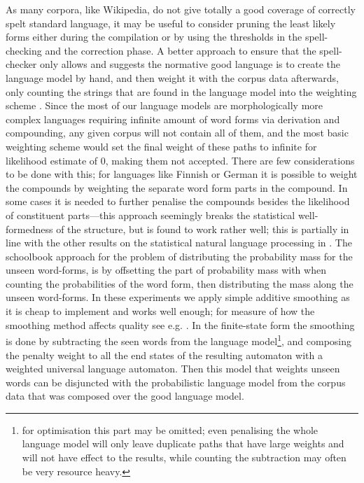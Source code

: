 \documentclass[a4paper,12pt]{article}
\begin{document}
As many corpora, like Wikipedia, do not give totally a good coverage of correctly
spelt standard language, it may be useful to consider pruning the least likely
forms either during the compilation or by using the thresholds in the spell-checking
and the correction phase. A better approach to ensure that the spell-checker only
allows and suggests the normative good language is to create the language model by
hand, and then weight it with the corpus data afterwards, only counting the strings
that are found in the language model into the weighting scheme
\cite[]{pirinen/2009/nodalida}. Since the most of our language models are
morphologically more complex languages requiring infinite amount of word forms
via derivation and compounding, any given corpus will not contain all of them,
and the most basic weighting scheme would set the final weight of these paths
to infinite for likelihood estimate of 0, making them not accepted. There are
few considerations to be done with this; for languages like Finnish or German
\cite[]{schiller2006german} it is possible to weight the compounds by weighting the
separate word form parts in the compound. In some cases it is needed to further
penalise the compounds besides the likelihood of constituent parts---this approach
seemingly breaks the statistical well-formedness of the structure, but is found
to work rather well; this is partially in line with the other results on
the statistical natural language processing in \cite{brants2007large}. The
schoolbook approach for the problem of distributing the probability mass for
the unseen word-forms, is by offsetting the part of probability mass with when
counting the probabilities of the word form, then distributing the mass along
the unseen word-forms\cite[for a good introduction to smoothing models we refer
to][]{jurafsky2000speech}. In these experiments we apply simple additive
smoothing as it is cheap to implement and works well enough; for measure of how the smoothing method affects quality see e.g.
\cite{chen1999empirical}. In the finite-state form the smoothing is done by
subtracting the seen words from the language model\footnote{for optimisation
    this part may be omitted; even penalising the whole language model will
    only leave duplicate paths that have large weights and will not have effect
    to the results, while counting the subtraction may often be very resource
heavy.}, and composing the penalty weight to all the end states of the resulting
automaton with a weighted universal language automaton. Then this model that
weights unseen words can be disjuncted with the probabilistic language model
from the corpus data that was composed over the good language model.
\end{document}
